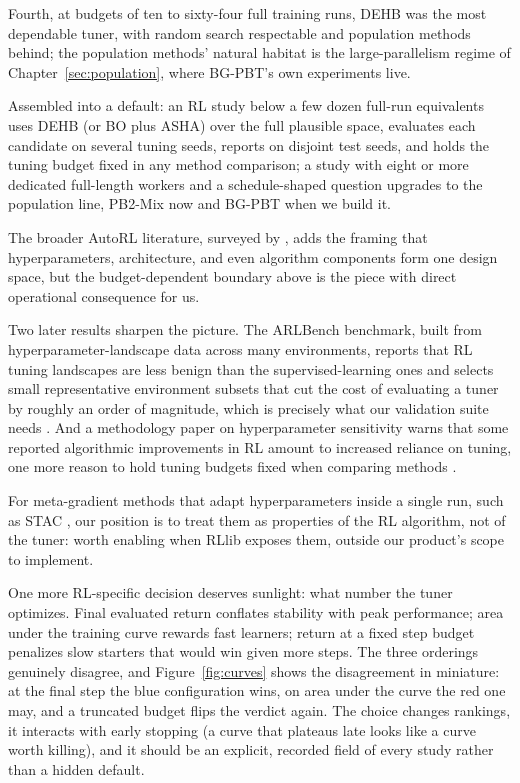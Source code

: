 Fourth, at budgets of ten to
sixty-four full training runs, DEHB was the most dependable tuner, with
random search respectable and population methods behind; the population
methods' natural habitat is the large-parallelism regime of
Chapter~\ref{sec:population}, where BG-PBT's own experiments live.

Assembled into a default: an RL study below a few dozen full-run
equivalents uses DEHB (or BO plus ASHA) over the full plausible space,
evaluates each candidate on several tuning seeds, reports on disjoint
test seeds, and holds the tuning budget fixed in any method comparison;
a study with eight or more dedicated full-length workers and a
schedule-shaped question upgrades to the population line, PB2-Mix now
and BG-PBT when we build it.

The broader AutoRL literature, surveyed by
\citet{parkerholder2022autorl}, adds the framing that hyperparameters,
architecture, and even algorithm components form one design space, but the
budget-dependent boundary above is the piece with direct operational
consequence for us.

Two later results sharpen the picture. The ARLBench
benchmark, built from hyperparameter-landscape data across many
environments, reports that RL tuning landscapes are less benign than the
supervised-learning ones and selects small representative environment
subsets that cut the cost of evaluating a tuner by roughly an order of
magnitude, which is precisely what our validation suite needs
\citep{becktepe2024arlbench}. And a methodology paper on hyperparameter
sensitivity warns that some reported algorithmic improvements in RL amount
to increased reliance on tuning, one more reason to hold tuning budgets
fixed when comparing methods \citep{adkins2024sensitivity}.

For
meta-gradient methods that adapt hyperparameters inside a single run, such
as STAC \citep{zahavy2020selftuning}, our position is to treat them as
properties of the RL algorithm, not of the tuner: worth enabling when
RLlib exposes them, outside our product's scope to implement.

One more RL-specific decision deserves sunlight: what number the tuner
optimizes. Final evaluated return conflates stability with peak
performance; area under the training curve rewards fast learners; return
at a fixed step budget penalizes slow starters that would win given more
steps. The three orderings genuinely disagree, and
Figure~\ref{fig:curves} shows the disagreement in miniature: at the
final step the blue configuration wins, on area under the curve the red
one may, and a truncated budget flips the verdict again. The choice
changes rankings, it interacts with early stopping (a curve that
plateaus late looks like a curve worth killing), and it should be an
explicit, recorded field of every study rather than a hidden default.

